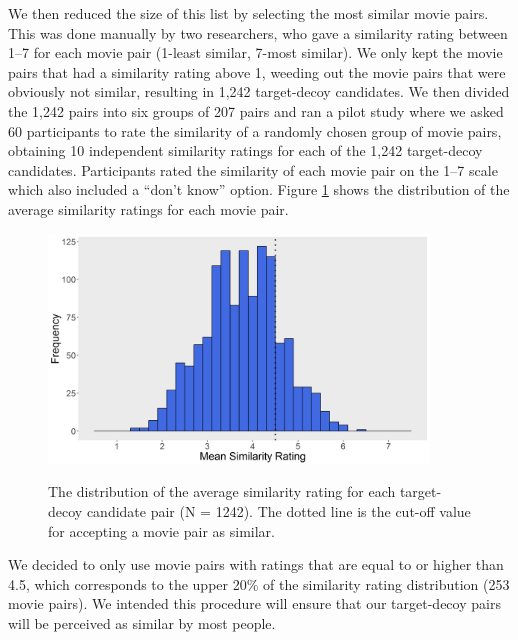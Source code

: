 \documentclass[12pt, a4paper]{article}
\begin{document}
We then reduced the size of this list by selecting the most similar movie pairs. This was done manually by two researchers, who gave a similarity rating between 1--7 for each movie pair (1-least similar, 7-most similar). We only kept the movie pairs that had a similarity rating above 1, weeding out the movie pairs that were obviously not similar, resulting in 1,242 target-decoy candidates. We then divided the 1,242 pairs into six groups of 207 pairs and ran a pilot study where we asked 60 participants to rate the similarity of a randomly chosen group of movie pairs, obtaining 10 independent similarity ratings for each of the 1,242 target-decoy candidates. Participants rated the similarity of each movie pair on the 1--7 scale which also included a ``don't know'' option. Figure \ref{fig:exp2_pilot}  shows the distribution of the average similarity ratings for each movie pair.

\begin{figure}[htb!]
\centering
\captionsetup{justification=centering}
		\caption{The distribution of the average similarity rating for each target-decoy candidate pair (N = 1242). The dotted line is the cut-off value for accepting a movie pair as similar.}
\includegraphics[width=0.9\textwidth]{exp2_pilot.png}
\label{fig:exp2_pilot}
\end{figure}

We decided to only use movie pairs with ratings that are equal to or higher than 4.5, which corresponds to the upper 20\% of the similarity rating distribution (253 movie pairs). We intended this procedure will ensure that our target-decoy pairs will be perceived as similar by most people.
\end{document}
